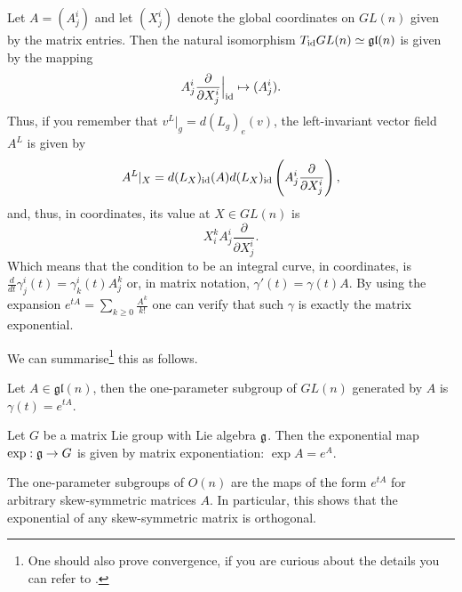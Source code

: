 Let $A = (A^i_j)$ and let $(X^i_j)$ denote the global coordinates on $GL(n)$ given by the matrix entries.
Then the natural isomorphism $T_{\operatorname{id}}GL(n) \simeq \mathfrak{gl}(n)$ is given by the mapping
\begin{equation}
  A^i_j \frac{\partial }{\partial X^i_j}\Big|_{\operatorname{id}} \mapsto (A^i_j).
\end{equation}
Thus, if you remember that $v^L|_g = d(L_g)_e(v)$, the left-invariant vector field $A^L$ is given by
\begin{equation}
  A^L|_X = d(L_X)_{\operatorname{id}}(A) d(L_X)_{\operatorname{id}}\left(A^i_j \frac{\partial }{\partial X^i_j}\right),
\end{equation}
and, thus, in coordinates, its value at $X\in GL(n)$ is
\begin{equation}
  X^k_i A^i_j \frac{\partial }{\partial X^i_j}.
\end{equation}
Which means that the condition to be an integral curve, in coordinates, is $\frac{d}{dt}\gamma^i_j(t) = \gamma^i_k(t) A^k_j$ or, in matrix notation, $\gamma'(t) = \gamma(t) A$.
By using the expansion $e^{tA} = \sum_{k\geq 0} \frac{A^k}{k!}$ one can verify that such $\gamma$ is exactly the matrix exponential.

We can summarise\footnote{One should also prove convergence, if you are curious about the details you can refer to \cite[Proposition 20.2]{book:lee}.} this as follows.

\begin{proposition}\label{prop:expmat}
  Let $A\in\mathfrak{gl}(n)$, then the one-parameter subgroup of $GL(n)$ generated by $A$ is $\gamma(t) = e^{tA}$.
\end{proposition}

\begin{corollary}
  Let $G$ be a matrix Lie group with Lie algebra $\mathfrak{g}$.
  Then the exponential map $\exp:\mathfrak{g}\to G$ is given by matrix exponentiation: $\exp A = e^A$.
\end{corollary}

\begin{exercise}
  The one-parameter subgroups of $O(n)$ are the maps of the form $e^{tA}$ for arbitrary skew-symmetric matrices $A$.
  In particular, this shows that the exponential of any skew-symmetric matrix is orthogonal.
\end{exercise}
